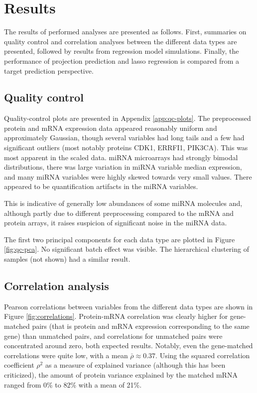 
\section{Results}

The results of performed analyses are presented as follows. First,
summaries on quality control and correlation analyses between the different
data types are presented, followed by results from regression model simulations.
Finally, the performance of projection prediction and lasso regression
is compared from a target prediction perspective.




\subsection*{Quality control}

Quality-control plots are presented in Appendix \ref{app:qc-plots}. 
The preprocessed protein and mRNA expression data appeared reasonably uniform
and approximately Gaussian, though several variables had long tails
and a few had significant outliers (most notably proteins CDK1, ERRFI1, PIK3CA).
This was most apparent in the scaled data. miRNA microarrays had strongly bimodal
distributions, there was large variation in miRNA variable median expression,
and many miRNA variables were highly skewed towards very small values.
There appeared to be quantification artifacts in the miRNA variables.

This is indicative of generally low abundances of some miRNA molecules
and, although partly due to different preprocessing compared to the mRNA and
protein arrays, it raises suspicion of significant noise in the miRNA data.

The first two principal components for each data type are plotted in Figure
\ref{fig:qc-pca}. No significant batch effect was visible. The hierarchical
clustering of samples (not shown) had a similar result.




\subsection*{Correlation analysis}

Pearson correlations between variables from the different data types are shown in Figure
\ref{fig:correlations}. Protein-mRNA correlation was clearly higher for gene-matched pairs
(that is protein and mRNA expression corresponding to the same gene) than unmatched pairs,
and correlations for unmatched pairs were concentrated around zero, both expected
results. Notably, even the gene-matched correlations were quite low, with a
mean $\bar{\rho} \approx 0.37$. Using the squared correlation coefficient $\rho^2$ as a
measure of explained variance (although this has been criticized), the amount
of protein variance explained by the matched mRNA ranged from 0\% to 82\% with a mean of
21\%.

